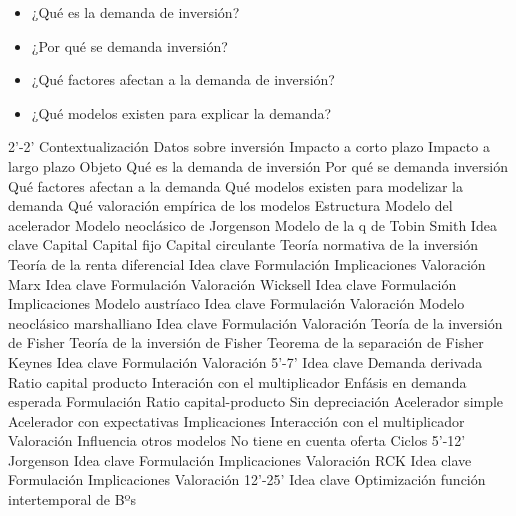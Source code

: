 \documentclass{nuevotema}
\begin{document}
\begin{itemize}
    \item ¿Qué es la demanda de inversión?
    \item ¿Por qué se demanda inversión?
    \item ¿Qué factores afectan a la demanda de inversión?
    \item ¿Qué modelos existen para explicar la demanda?
\end{itemize}

\esquemacorto

\begin{esquema}[enumerate]
	\1[]  2'-2'
		\2 Contextualización
			\3 Datos sobre inversión
			\3 Impacto a corto plazo
			\3 Impacto a largo plazo
		\2 Objeto
			\3 Qué es la demanda de inversión
			\3 Por qué se demanda inversión
			\3 Qué factores afectan a la demanda
			\3 Qué modelos existen para modelizar la demanda
			\3 Qué valoración empírica de los modelos
		\2 Estructura
			\3 Modelo del acelerador
			\3 Modelo neoclásico de Jorgenson
			\3 Modelo de la q de Tobin
	\1 
		\2 Smith
			\3 Idea clave
			\3 Capital
			\3 Capital fijo
			\3 Capital circulante
			\3 Teoría normativa de la inversión
		\2 Teoría de la renta diferencial
			\3 Idea clave
			\3 Formulación
			\3 Implicaciones
			\3 Valoración
		\2 Marx
			\3 Idea clave
			\3 Formulación
			\3 Valoración
		\2 Wicksell
			\3 Idea clave
			\3 Formulación
			\3 Implicaciones
		\2 Modelo austríaco
			\3 Idea clave
			\3 Formulación
			\3 Valoración
		\2 Modelo neoclásico marshalliano
			\3 Idea clave
			\3 Formulación
			\3 Valoración
		\2 Teoría de la inversión de Fisher
			\3 Teoría de la inversión de Fisher
			\3 Teorema de la separación de Fisher
		\2 Keynes
			\3 Idea clave
			\3 Formulación
			\3 Valoración
	\1  5'-7'
		\2 Idea clave
			\3 Demanda derivada
			\3 Ratio capital producto
			\3 Interación con el multiplicador
			\3 Enfásis en demanda esperada
		\2 Formulación
			\3 Ratio capital-producto
			\3 Sin depreciación
			\3 Acelerador simple
			\3 Acelerador con expectativas
		\2 Implicaciones
			\3 Interacción con el multiplicador
		\2 Valoración
			\3 Influencia otros modelos
			\3 No tiene en cuenta oferta
			\3 Ciclos
	\1  5'-12'
		\2 Jorgenson
			\3 Idea clave
			\3 Formulación
			\3 Implicaciones
			\3 Valoración
		\2 RCK
			\3 Idea clave
			\3 Formulación
			\3 Implicaciones
			\3 Valoración
	\1  12'-25'
		\2 Idea clave
			\3 Optimización función intertemporal de Bºs

\end{esquema}
\end{document}
